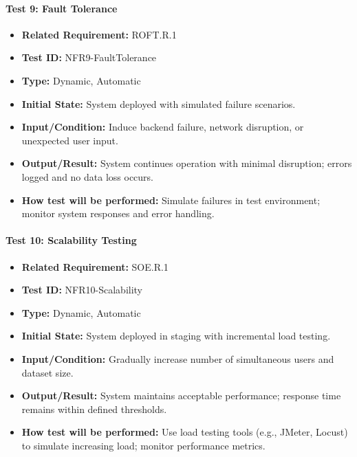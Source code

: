 \documentclass[12pt, titlepage]{article}
\begin{document}
\paragraph{Test 9: Fault Tolerance}
\begin{itemize}
    \item \textbf{Related Requirement:} ROFT.R.1
    \item \textbf{Test ID:} NFR9-FaultTolerance
    \item \textbf{Type:} Dynamic, Automatic
    \item \textbf{Initial State:} System deployed with simulated failure scenarios.
    \item \textbf{Input/Condition:} Induce backend failure, network disruption, or unexpected user input.
    \item \textbf{Output/Result:} System continues operation with minimal disruption; errors logged and no data loss occurs.
    \item \textbf{How test will be performed:} Simulate failures in test environment; monitor system responses and error handling.
\end{itemize}

\paragraph{Test 10: Scalability Testing}
\begin{itemize}
    \item \textbf{Related Requirement:} SOE.R.1
    \item \textbf{Test ID:} NFR10-Scalability
    \item \textbf{Type:} Dynamic, Automatic
    \item \textbf{Initial State:} System deployed in staging with incremental load testing.
    \item \textbf{Input/Condition:} Gradually increase number of simultaneous users and dataset size.
    \item \textbf{Output/Result:} System maintains acceptable performance; response time remains within defined thresholds.
    \item \textbf{How test will be performed:} Use load testing tools (e.g., JMeter, Locust) to simulate increasing load; monitor performance metrics.
\end{itemize}
\end{document}
